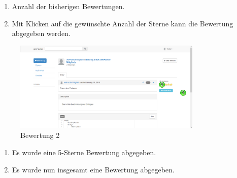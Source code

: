 \begin{enumerate}
\item Anzahl der bisherigen Bewertungen.
\item Mit Klicken auf die gewünschte Anzahl der Sterne kann die Bewertung abgegeben werden.
\end{enumerate}


\begin{figure}[H]
    \centering
    \includegraphics[width=0.8\textwidth]{Bilder/42.png}
    \caption{Bewertung 2}
    \label{fig:bewertung2}
\end{figure}


\begin{enumerate}
\item Es wurde eine 5-Sterne Bewertung abgegeben.
\item Es wurde nun insgesamt eine Bewertung abgegeben.
\end{enumerate}








